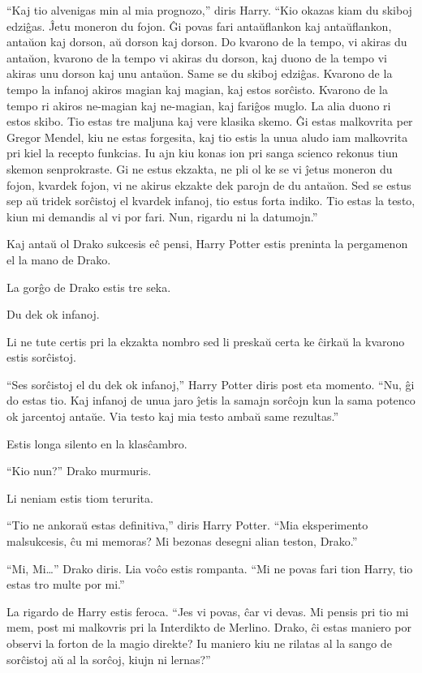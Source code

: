 ``Kaj tio alvenigas min al mia prognozo,'' diris Harry. ``Kio okazas
kiam du skiboj edziĝas. Ĵetu moneron du fojon. Ĝi povas fari
antaŭflankon kaj antaŭflankon, antaŭon kaj dorson, aŭ dorson kaj
dorson. Do kvarono de la tempo, vi akiras du antaŭon, kvarono de la
tempo vi akiras du dorson, kaj duono de la tempo vi akiras unu dorson
kaj unu antaŭon. Same se du skiboj edziĝas. Kvarono de la tempo la
infanoj akiros magian kaj magian, kaj estos sorĉisto. Kvarono de la
tempo ri akiros ne-magian kaj ne-magian, kaj fariĝos muglo. La alia
duono ri estos skibo. Tio estas tre maljuna kaj vere klasika skemo. Ĝi
estas malkovrita per Gregor Mendel, kiu ne estas forgesita, kaj tio
estis la unua aludo iam malkovrita pri kiel la recepto funkcias. Iu
ajn kiu konas ion pri sanga scienco rekonus tiun skemon
senprokraste. Gi ne estus ekzakta, ne pli ol ke se vi ĵetus moneron du
fojon, kvardek fojon, vi ne akirus ekzakte dek parojn de du
antaŭon. Sed se estus sep aŭ tridek sorĉistoj el kvardek infanoj, tio
estus forta indiko. Tio estas la testo, kiun mi demandis al vi por
fari. Nun, rigardu ni la datumojn.''

Kaj antaŭ ol Drako sukcesis eĉ pensi, Harry Potter estis preninta la pergamenon el la mano de Drako.

La gorĝo de Drako estis tre seka.

Du dek ok infanoj.

Li ne tute certis pri la ekzakta nombro sed li preskaŭ certa ke ĉirkaŭ la kvarono estis sorĉistoj.

``Ses sorĉistoj el du dek ok infanoj,'' Harry Potter diris post eta momento. ``Nu, ĝi do estas tio. Kaj infanoj de unua jaro ĵetis la samajn sorĉojn kun la sama potenco ok jarcentoj antaŭe. Via testo kaj mia testo ambaŭ same rezultas.''

Estis longa silento en la klasĉambro.

``Kio nun?'' Drako murmuris.

Li neniam estis tiom terurita.

``Tio ne ankoraŭ estas definitiva,'' diris Harry Potter. ``Mia eksperimento malsukcesis, ĉu mi memoras? Mi bezonas desegni alian teston, Drako.''

``Mi, Mi\ldots'' Drako diris. Lia voĉo estis rompanta. ``Mi ne povas fari tion Harry, tio estas tro multe por mi.''

La rigardo de Harry estis feroca. ``Jes vi povas, ĉar vi devas. Mi
pensis pri tio mi mem, post mi malkovris pri la Interdikto de
Merlino. Drako, ĉi estas maniero por observi la forton de la magio
direkte? Iu maniero kiu ne rilatas al la sango de sorĉistoj aŭ al la
sorĉoj, kiujn ni lernas?''

